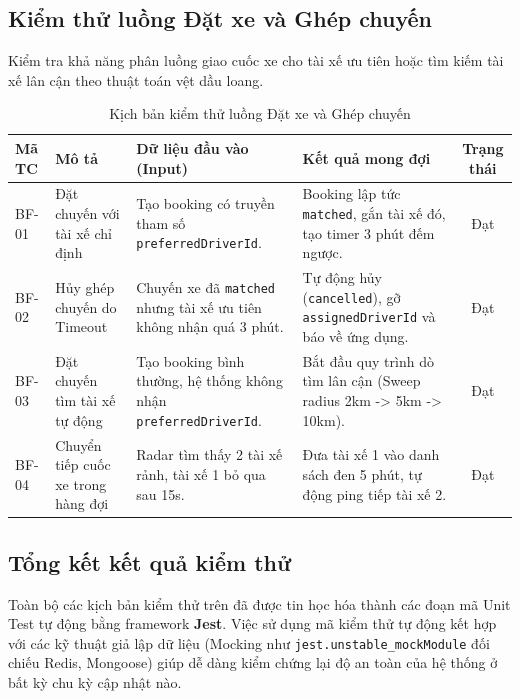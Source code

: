\documentclass[../DoAn.tex]{subfiles}
\begin{document}
\newpage
\subsection{Kiểm thử luồng Đặt xe và Ghép chuyến}
Kiểm tra khả năng phân luồng giao cuốc xe cho tài xế ưu tiên hoặc tìm kiếm tài xế lân cận theo thuật toán vệt dầu loang.

\begin{table}[H]
    \centering
    \caption{Kịch bản kiểm thử luồng Đặt xe và Ghép chuyến}
    \begin{tabular}{|l|p{3.5cm}|p{4.5cm}|p{4.5cm}|c|}
        \hline
        \textbf{Mã TC} & \textbf{Mô tả}                     & \textbf{Dữ liệu đầu vào (Input)}                                          & \textbf{Kết quả mong đợi}                                                          & \textbf{Trạng thái} \\ \hline
        BF-01          & Đặt chuyến với tài xế chỉ định     & Tạo booking có truyền tham số \texttt{preferredDriverId}.                 & Booking lập tức \texttt{matched}, gắn tài xế đó, tạo timer 3 phút đếm ngược.       & Đạt                 \\ \hline
        BF-02          & Hủy ghép chuyến do Timeout         & Chuyến xe đã \texttt{matched} nhưng tài xế ưu tiên không nhận quá 3 phút. & Tự động hủy (\texttt{cancelled}), gỡ \texttt{assignedDriverId} và báo về ứng dụng. & Đạt                 \\ \hline
        BF-03          & Đặt chuyến tìm tài xế tự động      & Tạo booking bình thường, hệ thống không nhận \texttt{preferredDriverId}.  & Bắt đầu quy trình dò tìm lân cận (Sweep radius 2km -> 5km -> 10km).                & Đạt                 \\ \hline
        BF-04          & Chuyển tiếp cuốc xe trong hàng đợi & Radar tìm thấy 2 tài xế rảnh, tài xế 1 bỏ qua sau 15s.                    & Đưa tài xế 1 vào danh sách đen 5 phút, tự động ping tiếp tài xế 2.                 & Đạt                 \\ \hline
    \end{tabular}
\end{table}

\subsection{Tổng kết kết quả kiểm thử}
Toàn bộ các kịch bản kiểm thử trên đã được tin học hóa thành các đoạn mã Unit Test tự động bằng framework \textbf{Jest}. Việc sử dụng mã kiểm thử tự động kết hợp với các kỹ thuật giả lập dữ liệu (Mocking như \texttt{jest.unstable\_mockModule} đối chiếu Redis, Mongoose) giúp dễ dàng kiểm chứng lại độ an toàn của hệ thống ở bất kỳ chu kỳ cập nhật nào.
\end{document}
